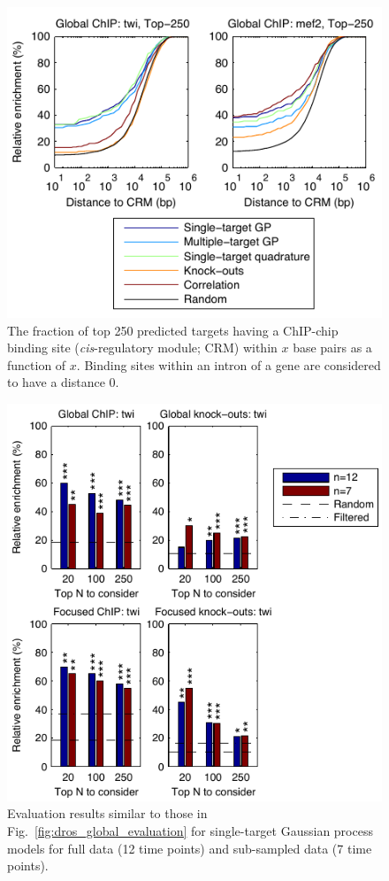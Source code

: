 \documentclass{pnastwo}
\begin{document}
\begin{article}
\begin{figure}[tb]
  \centering
  \includegraphics{fig4}
  \caption{The fraction of top 250 predicted targets having a ChIP-chip
    binding site (\emph{cis}-regulatory module; CRM)
    within $x$ base pairs as a function of $x$.
    Binding sites within an intron of a gene are considered to
    have a distance 0.
    \label{fig:dros_binding_site_distances}}
\end{figure}

\begin{figure}[tb]
  \centering
  \includegraphics{fig5}
  \caption{Evaluation results similar to those in 
    Fig.~\ref{fig:dros_global_evaluation}
    for single-target Gaussian process models
    for full data (12 time points) and sub-sampled data (7 time points).
    \label{fig:dros_data_size_evaluation}
  }
\end{figure}


\end{article}
\end{document}
